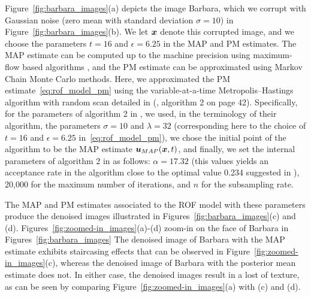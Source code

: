 Figure~\ref{fig:barbara_images}(a) depicts the image Barbara, which we corrupt with Gaussian noise (zero mean with standard deviation $\sigma = 10$) in Figure~\ref{fig:barbara_images}(b). We let $\boldsymbol{x}$ denote this corrupted image, and we choose the parameters $t = 16$ and $\epsilon = 6.25$ in the MAP and PM estimates. The MAP estimate can be computed up to the machine precision using maximum-flow based algorithms \cite{chambolle2009total,darbon2006image,hochbaum2001efficient}, and the PM estimate can be approximated using Markov Chain Monte Carlo methods. Here, we approximated the PM estimate~\eqref{eq:rof_model_pm} using the variable-at-a-time Metropolis--Hastings algorithm with random scan detailed in (\cite{louchet2008modeles}, algorithm 2 on page 42). Specifically, for the parameters of algorithm 2 in \cite{louchet2008modeles}, we used, in the terminology of their algorithm, the parameters $\sigma = 10$ and $\lambda = 32$ (corresponding here to the choice of $t = 16$ and $\epsilon = 6.25$ in~\eqref{eq:rof_model_pm}), we chose the initial point of the algorithm to be the MAP estimate $\boldsymbol{u}_{MAP}(\boldsymbol{x},t)$, and finally, we set the internal parameters of algorithm 2 in \cite{louchet2008modeles} as follows: $\alpha = 17.32$ (this values yields an acceptance rate in the algorithm close to the optimal value 0.234 suggested in \cite{roberts2001optimal}), 20,000 for the maximum number of iterations, and $n$ for the subsampling rate.

The MAP and PM estimates associated to the ROF model with these parameters produce the denoised images illustrated in Figures~\ref{fig:barbara_images}(c) and (d). Figures~\ref{fig:zoomed-in_images}(a)-(d) zoom-in on the face of Barbara in Figures~\ref{fig:barbara_images} The denoised image of Barbara with the MAP estimate exhibits staircasing effects \cite{chan2000high,dobson1996recovery,durand2000image} that can be observed in Figure~\ref{fig:zoomed-in_images}(c), whereas the denoised image of Barbara with the posterior mean estimate does not. In either case, the denoised images result in a lost of texture, as can be seen by comparing Figure~\ref{fig:zoomed-in_images}(a) with (c) and (d). 


